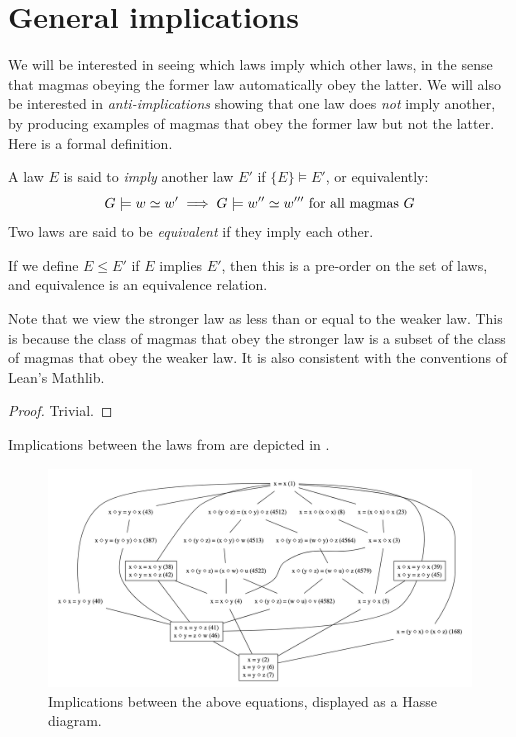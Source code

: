 \chapter{General implications}\label{general-implications-chapter}
We will be interested in seeing which laws imply which other laws, in the sense that magmas obeying the former law automatically obey the latter. We will also be interested in \emph{anti-implications} showing that one law does \emph{not} imply another, by producing examples of magmas that obey the former law but not the latter. Here is a formal definition.

\begin{definition}[Implication]\label{impl}
  A law $E$ is said to \emph{imply} another law $E'$ if $\{E\} \models E'$, or equivalently:
  $$ G \models w  \simeq  w' \implies G \models w''  \simeq  w''' \hbox{ for all magmas } G$$
  Two laws are said to be \emph{equivalent} if they imply each other.
\end{definition}

\begin{lemma}\leanok\label{pre-order}
  If we define $E \leq E'$ if $E$ implies $E'$, then this is a pre-order on the set of laws, and equivalence is an equivalence relation.
\end{lemma}

Note that we view the stronger law as less than or equal to the weaker law. This is because the class of magmas that obey the stronger law is a subset of the class of magmas that obey the weaker law. It is also consistent with the conventions of Lean's Mathlib.

\begin{proof}\leanok
  Trivial.
\end{proof}

Implications between the laws from  are depicted in .

\begin{figure}
  \centering
  \includegraphics[width=1\linewidth]{../../images/subgraph.png}
  \caption{Implications between the above equations, displayed as a Hasse diagram.}
  \label{fig:implications}
\end{figure}

